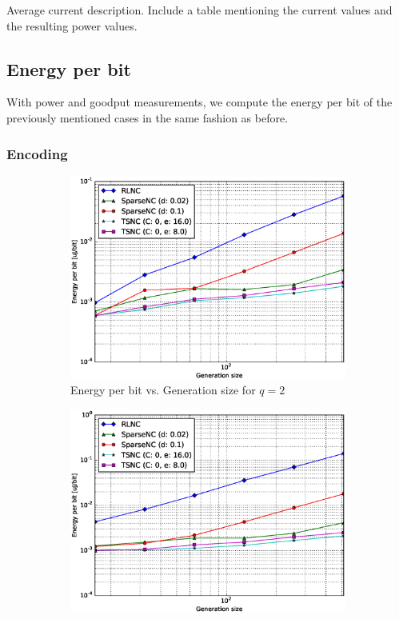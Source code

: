 Average current description. Include a table mentioning the current values
and the resulting power values.

\subsection{Energy per bit}
With power and goodput measurements, we compute the energy per bit of
the previously mentioned cases in the same fashion as before.

\subsubsection{Encoding}

\begin{figure}
    \centering
    \begin{subfigure}[b]{0.475\textwidth}
        \centering
        \includegraphics[width=1.1\textwidth]{images/06_06_2016/energy_per_bit_vs_generation_size_Rasp_Binary_encoder_1600.eps}
        \caption[]%
        {{\small Energy per bit vs. Generation size for $q = 2$}}
        \label{fig:enc_ene_rasp1_gen_gf2}
    \end{subfigure}
    \hfill
    \begin{subfigure}[b]{0.475\textwidth}
        \centering
        \includegraphics[width=1.1\textwidth]{images/06_06_2016/energy_per_bit_vs_generation_size_Rasp_Binary8_encoder_1600.eps}

\end{subfigure}
\end{figure}
